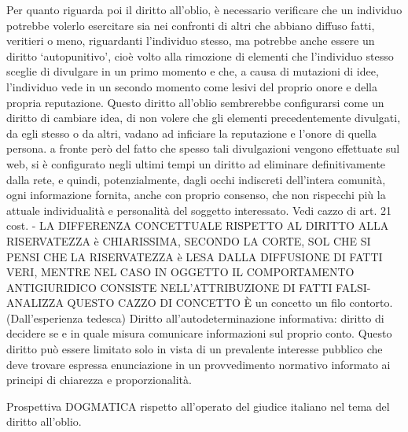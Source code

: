 Per quanto riguarda poi il diritto all’oblio, è necessario verificare che un individuo potrebbe volerlo esercitare sia nei confronti di altri che abbiano diffuso fatti, veritieri o meno, riguardanti l’individuo stesso, ma potrebbe anche essere un diritto ‘autopunitivo’, cioè volto alla rimozione di elementi che l’individuo stesso sceglie di divulgare in un primo momento e che, a causa di mutazioni di idee, l’individuo vede in un secondo momento come lesivi del proprio onore e della propria reputazione.
Questo diritto all’oblio sembrerebbe configurarsi come un diritto di cambiare idea, di non volere che  gli elementi precedentemente divulgati, da egli stesso o da altri, vadano ad inficiare la reputazione e l’onore di quella persona. a fronte però del fatto che spesso tali divulgazioni vengono effettuate sul web, si è configurato negli ultimi tempi un diritto ad eliminare definitivamente dalla rete, e quindi, potenzialmente, dagli occhi indiscreti dell’intera comunità, ogni informazione fornita, anche con proprio consenso, che non rispecchi più la attuale individualità e personalità del soggetto interessato. Vedi cazzo di art. 21 cost.
-	LA DIFFERENZA CONCETTUALE RISPETTO AL DIRITTO ALLA RISERVATEZZA è CHIARISSIMA, SECONDO LA CORTE, SOL CHE SI PENSI CHE LA RISERVATEZZA è LESA DALLA DIFFUSIONE DI FATTI VERI, MENTRE NEL CASO IN OGGETTO IL COMPORTAMENTO ANTIGIURIDICO CONSISTE NELL’ATTRIBUZIONE DI FATTI FALSI-
ANALIZZA QUESTO CAZZO DI CONCETTO
È un concetto un filo contorto.
(Dall’esperienza tedesca) Diritto all’autodeterminazione informativa: diritto di decidere se e in quale misura comunicare informazioni sul proprio conto.  Questo diritto può essere limitato solo in vista di un prevalente interesse pubblico che deve trovare espressa enunciazione in un provvedimento normativo informato ai principi di chiarezza e proporzionalità.

Prospettiva DOGMATICA rispetto all’operato del giudice italiano nel tema del diritto all’oblio.


